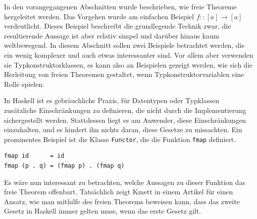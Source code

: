 
In den vorangegangenen Abschnitten wurde beschrieben, wie freie Theoreme hergeleitet werden. Das Vorgehen wurde am einfachen
Beispiel $f :: [a] \rightarrow [a]$ verdeutlicht. Dieses Beispiel beschreibt die grundlegende Technik zwar, die resultierende
Aussage ist aber relativ simpel und darüber hinaus kaum weltbewegend. 
In diesem Abschnitt sollen zwei Beispiele betrachtet werden, die ein wenig komplexer und auch etwas interessanter sind. Vor
allem aber verwenden sie Typkonstruktorklassen, es kann also an Beispielen gezeigt werden, wie sich die Herleitung
von freien Theoremen gestaltet, wenn Typkonstruktorvariablen eine Rolle spielen.


In Haskell ist es gebräuchliche Praxis, für Datentypen oder Typklassen zusätzliche Einschränkungen zu definieren, die nicht durch
die Implementierung sichergestellt werden. Stattdessen liegt es am Anwender, diese Einschränkungen einzuhalten, und es hindert
ihn nichts daran, diese Gesetze zu missachten. Ein prominentes Beispiel ist die Klasse \texttt{Functor}, die die Funktion
\texttt{fmap} definiert.



\begin{verbatim}
fmap id      = id
fmap (p . q) = (fmap p) . (fmap q)
\end{verbatim}


Es wäre nun interessant zu betrachten, welche Aussagen zu dieser Funktion das freie Theorem offenbart. Tatsächlich zeigt
Kmett in einem Artikel für \cite{schoolofhaskell.com} \cite{fmap} einen Ansatz, wie man mithilfe des freien Theorems beweisen
kann, dass das zweite Gesetz in Haskell immer gelten muss, wenn das erste Gesetz gilt. 

